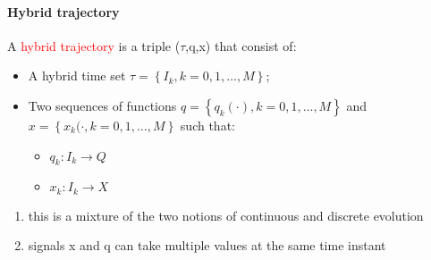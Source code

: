 \paragraph{Hybrid trajectory}
A \textcolor{red}{hybrid trajectory} is a triple ($\tau$,q,x) that consist of:
\begin{itemize}
	\item A hybrid time set $\tau = \left\{I_k, k=0,1,\dots,M\right\}$;
	\item Two sequences of functions $q = \left\{q_k(\cdot), k=0,1,\dots,M\right\}$  and $x = \left\{x_k(\cdot, k=0,1,\dots,M\right\}$ such that:
	\begin{itemize}
		\item $q_k\colon I_k\to Q$
		\item $x_k\colon I_k \to X$
	\end{itemize}
\end{itemize}
\begin{remark}
	\begin{enumerate}
		\item this is a mixture of the two notions of continuous and discrete evolution
		\item signals x and q can take multiple values at the same time instant
	\end{enumerate}
\end{remark}

